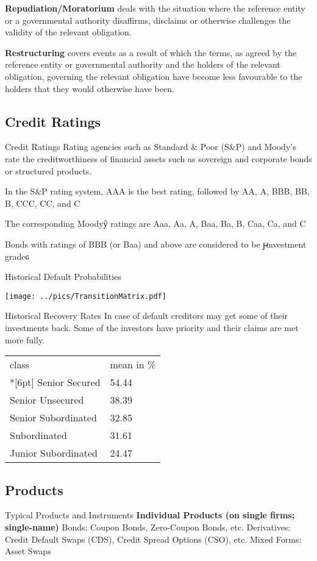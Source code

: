 	\textbf{Repudiation/Moratorium} deals with the situation where the reference entity or a governmental authority disaffirms, disclaims or otherwise 
	challenges the validity of the relevant obligation.
	
	\textbf{Restructuring} covers events as a result of which the terms, as agreed by the reference entity or governmental authority and the holders of 
	the relevant obligation, governing the relevant obligation have become less favourable to the holders that they would otherwise have been.
	

\subsection{Credit Ratings}
Credit Ratings
	Rating agencies such as Standard \& Poor (S\&P) and Moody's rate the creditworthiness of financial assets such as
	sovereign and corporate bonds or structured products.
	
	In the S\&P rating system, AAA is the best rating, followed by  AA, A, BBB, BB, B, CCC, CC, and C
	
	The corresponding Moodyӳ ratings are Aaa, Aa, A, Baa, Ba, B, Caa, Ca, and C
	
	Bonds with ratings of BBB (or Baa) and above are considered to be ԩnvestment gradeԍ


Historical Default Probabilities
\begin{center}
	\texttt{[image: ../pics/TransitionMatrix.pdf]}
\end{center}


Historical Recovery Rates
	In case of default creditors may get some of their investments back.
	Some of the investors have priority and their claims are met more fully.
	\begin{center}
	\begin{tabular}{l|l}
	class & mean in \% \\*[6pt]\hline
	Senior Secured	& 54.44\\
	Senior Unsecured & 38.39\\
	Senior Subordinated	& 32.85\\
	Subordinated & 31.61\\
	Junior Subordinated & 24.47\\
	\end{tabular}
	\end{center}


\subsection{Products}
Typical Products and Instruments
	\textbf{Individual Products (on single firms; single-name)}
			Bonds: Coupon Bonds, Zero-Coupon Bonds, etc.
			Derivatives: Credit Default Swaps (CDS), Credit Spread Options (CSO), etc.
			Mixed Forms: Asset Swaps
		
